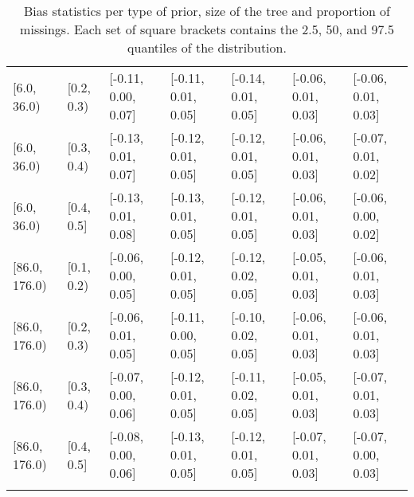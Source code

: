 \begin{table}[ht]
\begin{tabular}{lllllll}
  {[6.0, 36.0)} & {[0.2, 0.3)} & {[-0.11, 0.00, 0.07]} & {[-0.11, 0.01, 0.05]} & {[-0.14, 0.01, 0.05]} & {[-0.06, 0.01, 0.03]} & {[-0.06, 0.01, 0.03]} \\ 
  {[6.0, 36.0)} & {[0.3, 0.4)} & {[-0.13, 0.01, 0.07]} & {[-0.12, 0.01, 0.05]} & {[-0.12, 0.01, 0.05]} & {[-0.06, 0.01, 0.03]} & {[-0.07, 0.01, 0.02]} \\ 
  {[6.0, 36.0)} & {[0.4, 0.5]} & {[-0.13, 0.01, 0.08]} & {[-0.13, 0.01, 0.05]} & {[-0.12, 0.01, 0.05]} & {[-0.06, 0.01, 0.03]} & {[-0.06, 0.00, 0.02]} \\ 
  {[86.0, 176.0)} & {[0.1, 0.2)} & {[-0.06, 0.00, 0.05]} & {[-0.12, 0.01, 0.05]} & {[-0.12, 0.02, 0.05]} & {[-0.05, 0.01, 0.03]} & {[-0.06, 0.01, 0.03]} \\ 
  {[86.0, 176.0)} & {[0.2, 0.3)} & {[-0.06, 0.01, 0.05]} & {[-0.11, 0.00, 0.05]} & {[-0.10, 0.02, 0.05]} & {[-0.06, 0.01, 0.03]} & {[-0.06, 0.01, 0.03]} \\ 
  {[86.0, 176.0)} & {[0.3, 0.4)} & {[-0.07, 0.00, 0.06]} & {[-0.12, 0.01, 0.05]} & {[-0.11, 0.02, 0.05]} & {[-0.05, 0.01, 0.03]} & {[-0.07, 0.01, 0.03]} \\ 
  {[86.0, 176.0)} & {[0.4, 0.5]} & {[-0.08, 0.00, 0.06]} & {[-0.13, 0.01, 0.05]} & {[-0.12, 0.01, 0.05]} & {[-0.07, 0.01, 0.03]} & {[-0.07, 0.00, 0.03]} \\ 
   \bottomrule
\multicolumn{7}{l}{}\\
\end{tabular}
\caption{Bias statistics per type of prior, size of the tree and proportion of missings. Each set of square brackets contains the 2.5, 50, and 97.5 quantiles of the distribution.} 
\label{tab:bias-prior-size-missigness}
\end{table}
